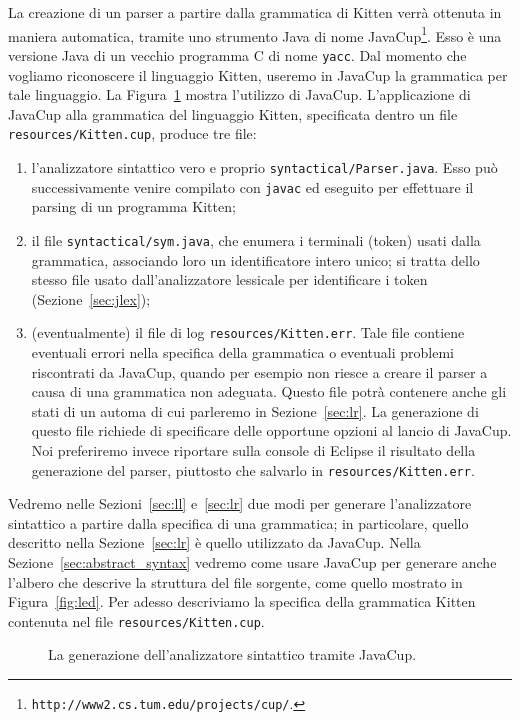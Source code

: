 La creazione di un parser a partire dalla grammatica di
Kitten verr\`a ottenuta in maniera automatica, tramite uno strumento Java
di nome JavaCup\footnote{\texttt{http://www2.cs.tum.edu/projects/cup/}.}.
Esso \`e una versione Java di un vecchio programma C
di nome \texttt{yacc}.
Dal momento che vogliamo riconoscere il linguaggio Kitten, useremo
in JavaCup la grammatica per tale linguaggio.
La Figura~\ref{fig:java_cup} mostra l'utilizzo di JavaCup.
L'applicazione di JavaCup alla grammatica del linguaggio
Kitten, specificata dentro un file \texttt{resources/Kitten.cup},
produce tre file:
%
\begin{enumerate}
\item l'analizzatore sintattico vero e proprio
      \texttt{syntactical/Parser.java}. Esso pu\`o successivamente
      venire compilato con \texttt{javac} ed eseguito per effettuare il parsing
      di un programma Kitten;
\item il file \texttt{syntactical/sym.java}, che enumera i terminali
      (token) usati dalla grammatica, associando loro un identificatore
      intero unico; si tratta dello stesso file usato dall'analizzatore
      lessicale per identificare i token (Sezione~\ref{sec:jlex});
\item (eventualmente) il file di log \texttt{resources/Kitten.err}. Tale file contiene
      eventuali errori nella specifica della grammatica o eventuali
      problemi riscontrati da JavaCup, quando per esempio non riesce a
      creare il parser a causa di una grammatica non adeguata.
      Questo file potr\`a contenere anche gli stati di un automa di cui parleremo
      in Sezione~\ref{sec:lr}. La generazione di questo file richiede di
      specificare delle opportune opzioni al lancio di JavaCup. Noi preferiremo
      invece riportare sulla console di Eclipse il risultato della generazione
      del parser, piuttosto che salvarlo in \texttt{resources/Kitten.err}.
\end{enumerate}
%

Vedremo nelle Sezioni~\ref{sec:ll} e~\ref{sec:lr} due modi per
generare l'analizzatore sintattico a partire dalla specifica di una grammatica;
in particolare, quello descritto nella Sezione~\ref{sec:lr} \`e quello
utilizzato da JavaCup. Nella Sezione~\ref{sec:abstract_syntax} vedremo
come usare JavaCup per generare anche l'albero che descrive la struttura
del file sorgente, come quello mostrato in Figura~\ref{fig:led}.
Per adesso descriviamo la specifica della grammatica
Kitten contenuta nel file \texttt{resources/Kitten.cup}.
%
\begin{figure}[t]
\begin{center}
\end{center}
\caption{La generazione dell'analizzatore sintattico tramite JavaCup.}
  \label{fig:java_cup}
\end{figure}
%
